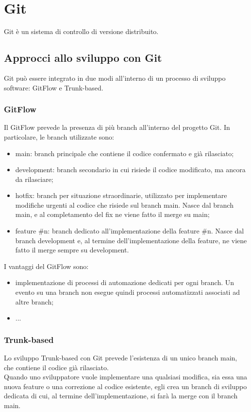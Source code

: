 \chapter{Git}
Git è un sistema di controllo di versione distribuito.

\section{Approcci allo sviluppo con Git}
Git può essere integrato in due modi all'interno di un processo di sviluppo software: GitFlow e Trunk-based.
\subsection{GitFlow}
Il GitFlow prevede la presenza di più branch all'interno del progetto Git. In particolare, le branch utilizzate sono:
\begin{itemize}
    \item main: branch principale che contiene il codice confermato e già rilasciato;
    \item development: branch secondario in cui risiede il codice modificato, ma ancora da rilasciare;
    \item hotfix: branch per situazione straordinarie, utilizzato per implementare modifiche urgenti al codice che risiede sul branch main. Nasce dal branch main, e al completamento del fix ne viene fatto il merge su main;
    \item feature \#n: branch dedicato all'implementazione della feature \#n. Nasce dal branch development e, al termine dell'implementazione della feature, ne viene fatto il merge sempre su development.
\end{itemize}

I vantaggi del GitFlow sono:
\begin{itemize}
    \item implementazione di processi di automazione dedicati per ogni branch. Un evento su una branch non esegue quindi processi automatizzati associati ad altre branch;
    \item ...
\end{itemize}

\subsection{Trunk-based}
Lo sviluppo Trunk-based con Git prevede l'esistenza di un unico branch main, che contiene il codice già rilasciato.\\
Quando uno sviluppatore vuole implementare una qualsiasi modifica, sia essa una nuova feature o una correzione al codice esistente, egli crea un branch di sviluppo dedicata di cui, al termine dell'implementazione, si farà la merge con il branch main.

